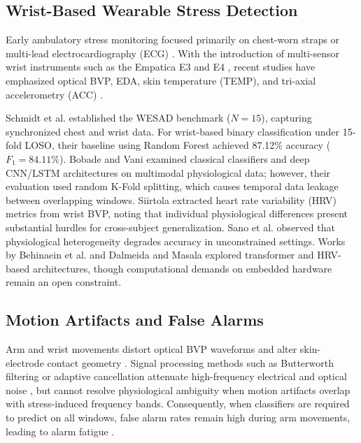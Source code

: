 \documentclass[conference]{IEEEtran}
\begin{document}
\subsection{Wrist-Based Wearable Stress Detection}
Early ambulatory stress monitoring focused primarily on chest-worn straps or multi-lead electrocardiography (ECG) \cite{taskforce1996heart}. With the introduction of multi-sensor wrist instruments such as the Empatica E3 and E4 \cite{garbarino2014empatica}, recent studies have emphasized optical BVP, EDA, skin temperature (TEMP), and tri-axial accelerometry (ACC) \cite{can2019stress, gjoreski2016continuous}.

Schmidt et al. \cite{schmidt2018wesad} established the WESAD benchmark ($N=15$), capturing synchronized chest and wrist data. For wrist-based binary classification under 15-fold LOSO, their baseline using Random Forest achieved 87.12\% accuracy ($F_1 = 84.11\%$). Bobade and Vani \cite{bobade2020stress} examined classical classifiers and deep CNN/LSTM architectures on multimodal physiological data; however, their evaluation used random K-Fold splitting, which causes temporal data leakage between overlapping windows. Siirtola \cite{siirtola2019continuous} extracted heart rate variability (HRV) metrics from wrist BVP, noting that individual physiological differences present substantial hurdles for cross-subject generalization. Sano et al. \cite{sano2015recognizing} observed that physiological heterogeneity degrades accuracy in unconstrained settings. Works by Behinaein et al. \cite{behinaein2021transformer} and Dalmeida and Masala \cite{dalmeida2021hrv} explored transformer and HRV-based architectures, though computational demands on embedded hardware remain an open constraint.

\subsection{Motion Artifacts and False Alarms}
Arm and wrist movements distort optical BVP waveforms and alter skin-electrode contact geometry \cite{tamura2014wearable, zhang2014troika, schumm2008effect}. Signal processing methods such as Butterworth filtering or adaptive cancellation attenuate high-frequency electrical and optical noise \cite{zhang2014troika}, but cannot resolve physiological ambiguity when motion artifacts overlap with stress-induced frequency bands. Consequently, when classifiers are required to predict on all windows, false alarm rates remain high during arm movements, leading to alarm fatigue \cite{sendelbach2013alarm}.
\end{document}
